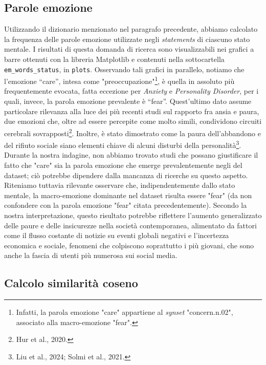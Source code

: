 \documentclass[11pt]{article}
\begin{document}
\subsection{Parole emozione}
\label{ssec:layout}

Utilizzando il dizionario menzionato nel paragrafo precedente, abbiamo calcolato la frequenza delle parole emozione utilizzate negli \textit{statements} di ciascuno stato mentale. I risultati di questa domanda di ricerca sono visualizzabili nei grafici a barre ottenuti con la libreria Matplotlib e contenuti nella sottocartella \texttt{em\_words\_status}, in \texttt{plots}. Osservando tali grafici in parallelo, notiamo che
l’emozione “care”, intesa come "preoccupazione"\footnote{Infatti, la parola emozione "care" appartiene al \textit{synset} "concern.n.02", associato alla macro-emozione "fear".}, è quella in assoluto più frequentemente evocata, fatta eccezione per \textit{Anxiety} e \textit{Personality Disorder}, per i quali, invece, la parola emozione prevalente è “fear”. Quest'ultimo dato assume particolare rilevanza alla luce dei più recenti studi sul rapporto fra ansia e paura, due emozioni che, oltre ad essere percepite come molto simili, condividono circuiti cerebrali sovrapposti\footnote{Hur et al., 2020.}. Inoltre, è stato dimostrato come la paura dell'abbandono e del rifiuto sociale siano elementi chiave di alcuni disturbi della personalità\footnote{Liu et al., 2024; Solmi et al., 2021.}. Durante la nostra indagine, non abbiamo trovato studi che possano giustificare il fatto che "care" sia la parola emozione che emerge prevalentemente negli  del dataset; ciò potrebbe dipendere dalla mancanza di ricerche su questo aspetto. Riteniamo tuttavia rilevante osservare che, indipendentemente dallo stato mentale, la macro-emozione dominante nel dataset risulta essere "fear" (da non confondere con la parola emozione "fear" citata precedentemente). Secondo la nostra interpretazione, questo risultato potrebbe riflettere l'aumento generalizzato delle paure e delle insicurezze nella società contemporanea, alimentato da fattori come il flusso costante di notizie su eventi globali negativi e l'incertezza economica e sociale, fenomeni che colpiscono soprattutto i più giovani, che sono anche la fascia di utenti più numerosa sui social media. 

\subsection{Calcolo similarità coseno}
\label{ssec:layout}
\end{document}
